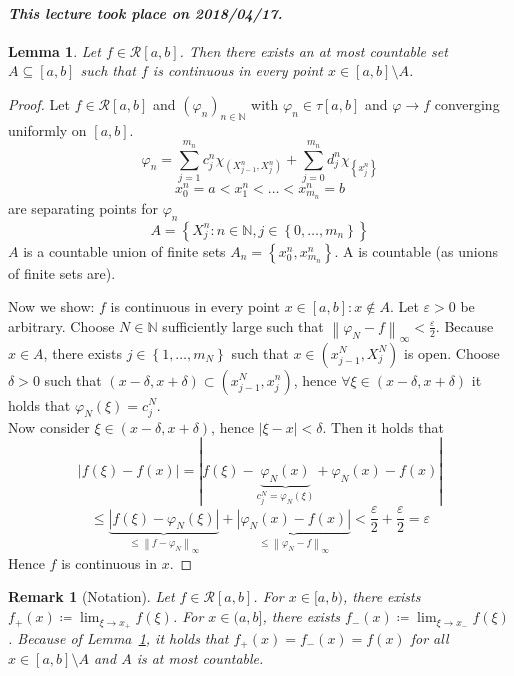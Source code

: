 \documentclass{article}
\newtheorem{lemma}{Lemma}  \numberwithin{lemma}{section}
\newtheorem{remark}{Remark}  \numberwithin{remark}{section}
\newcommand{\set}[1]{\left\{#1\right\}}
\newcommand{\norm}[1]{\left\|#1\right\|}
\newcommand{\card}[1]{\left|#1\right|}
\newcommand{\dateref}[1]{\paragraph{\textit{This lecture took place on #1.}}}
\begin{document}
\dateref{2018/04/17}

\begin{lemma} %
  \label{lemma9}
  Let $f \in \mathcal R[a,b]$. Then there exists an at most countable set $A \subseteq [a,b]$ such that $f$ is continuous in every point $x \in [a,b] \setminus A$.
\end{lemma}
\begin{proof}
  Let $f \in \mathcal R[a,b]$ and $(\varphi_n)_{n \in \mathbb N}$ with $\varphi_n \in \tau[a,b]$ and $\varphi \to f$ converging uniformly on $[a,b]$.
  \[ \varphi_n = \sum_{j=1}^{m_n} c_j^n \chi_{(X_{j-1}^n, X_j^n)} + \sum_{j=0}^{m_n} d_j^n \chi_{\set{x_j^n}} \]
  \[ x_0^n = a < x_1^n < \ldots < x_{m_n}^n = b \]
  are separating points for $\varphi_n$
  \[ A = \set{X_j^n: n \in \mathbb N, j \in \set{0, \ldots, m_n}} \]
  $A$ is a countable union of finite sets $A_n = \set{x_0^n, x_{m_n}^n}$. A is countable (as unions of finite sets are).

  Now we show: $f$ is continuous in every point $x \in [a,b]: x \not\in A$.
  Let $\varepsilon > 0$ be arbitrary. Choose $N \in \mathbb N$ sufficiently large such that $\norm{\varphi_N - f}_{\infty} < \frac\varepsilon2$. Because $x \in A$, there exists $j \in \set{1, \ldots, m_N}$ such that $x \in (x_{j-1}^N, X_j^N)$ is open.
  Choose $\delta > 0$ such that $(x - \delta, x + \delta) \subset (x_{j-1}^N, x_j^n)$, hence $\forall \xi \in (x - \delta, x + \delta)$ it holds that $\varphi_N(\xi) = c_j^N$. \\
  Now consider $\xi \in (x - \delta, x + \delta)$, hence $\card{\xi - x} < \delta$. Then it holds that
  \[ \card{f(\xi) - f(x)} = \card{f(\xi) - \underbrace{\varphi_N(x)}_{c_j^N = \varphi_N(\xi)} + \varphi_N(x) - f(x)} \]
  \[ \leq \underbrace{\card{f(\xi) - \varphi_N(\xi)}}_{\leq \norm{f - \varphi_N}_{\infty}} + \underbrace{\card{\varphi_N(x) - f(x)}}_{\leq \norm{\varphi_N - f}_{\infty}} < \frac\varepsilon2 + \frac\varepsilon2 = \varepsilon \]
  Hence $f$ is continuous in $x$.
\end{proof}

\begin{remark}[Notation]
  Let $f \in \mathcal R[a,b]$. For $x \in [a,b)$, there exists $f_+(x) \coloneqq \lim_{\xi \to x_+} f(\xi)$.
  For $x \in (a,b]$, there exists $f_-(x) \coloneqq \lim_{\xi \to x_-} f(\xi)$.
  Because of Lemma~\ref{lemma9}, it holds that $f_+(x) = f_-(x) = f(x)$ for all $x \in [a,b] \setminus A$ and $A$ is at most countable.
\end{remark}
\end{document}

